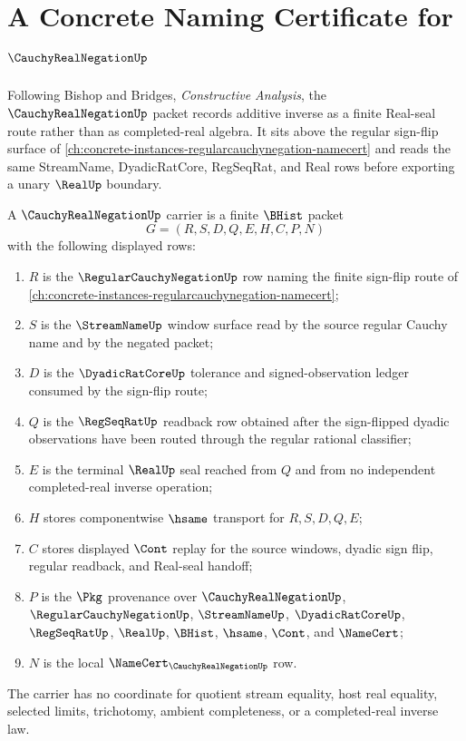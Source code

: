 \chapter{A Concrete Naming Certificate for $\CauchyRealNegationUp$}
\label{ch:concrete-instances-cauchy-real-negation-namecert}

Following Bishop and Bridges, \emph{Constructive Analysis}, the $\CauchyRealNegationUp$ packet records additive inverse as a finite Real-seal route rather than as completed-real algebra. It sits above the regular sign-flip surface of \autoref{ch:concrete-instances-regularcauchynegation-namecert} and reads the same StreamName, DyadicRatCore, RegSeqRat, and Real rows before exporting a unary $\RealUp$ boundary.

\begin{definition}
\label{def:cauchy-real-negation-carrier}
A $\CauchyRealNegationUp$ carrier is a finite $\BHist$ packet
$$
G=(R,S,D,Q,E,H,C,P,N)
$$
with the following displayed rows:
\begin{enumerate}
\item $R$ is the $\RegularCauchyNegationUp$ row naming the finite sign-flip route of \autoref{ch:concrete-instances-regularcauchynegation-namecert};
\item $S$ is the $\StreamNameUp$ window surface read by the source regular Cauchy name and by the negated packet;
\item $D$ is the $\DyadicRatCoreUp$ tolerance and signed-observation ledger consumed by the sign-flip route;
\item $Q$ is the $\RegSeqRatUp$ readback row obtained after the sign-flipped dyadic observations have been routed through the regular rational classifier;
\item $E$ is the terminal $\RealUp$ seal reached from $Q$ and from no independent completed-real inverse operation;
\item $H$ stores componentwise $\hsame$ transport for $R,S,D,Q,E$;
\item $C$ stores displayed $\Cont$ replay for the source windows, dyadic sign flip, regular readback, and Real-seal handoff;
\item $P$ is the $\Pkg$ provenance over $\CauchyRealNegationUp$, $\RegularCauchyNegationUp$, $\StreamNameUp$, $\DyadicRatCoreUp$, $\RegSeqRatUp$, $\RealUp$, $\BHist$, $\hsame$, $\Cont$, and $\NameCert$;
\item $N$ is the local $\NameCert_{\CauchyRealNegationUp}$ row.
\end{enumerate}
The carrier has no coordinate for quotient stream equality, host real equality, selected limits, trichotomy, ambient completeness, or a completed-real inverse law.
\end{definition}

